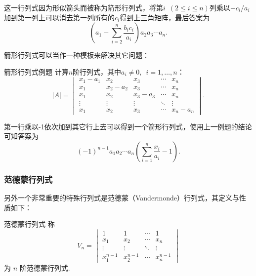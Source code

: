 \begin{solution}
    这一行列式因为形似箭头而被称为箭形行列式，将第$i\enspace(2\leqslant i\leqslant n)$列乘以$-c_i/a_i$加到第一列上可以消去第一列所有的$c_i$得到上三角矩阵，最后答案为
    \[
    (a_1-\sum\limits_{i=2}^n\dfrac{b_ic_i}{a_i})a_2a_3\cdots a_n.
    \]
\end{solution}

箭形行列式可以当作一种模板来解决其它问题：

\begin{example}{}{箭形行列式例题}
    计算$n$阶行列式，其中$a_i\neq 0,\enspace i=1,\ldots,n$：
    \[|A|=\begin{vmatrix}
            x_1-a_1 & x_2     & x_3     & \cdots & x_n     \\
            x_1     & x_2-a_2 & x_3     & \cdots & x_n     \\
            x_1     & x_2     & x_3-a_3 & \cdots & x_n     \\
            \vdots  & \vdots  & \vdots  & \ddots & \vdots  \\
            x_1     & x_2     & x_3     & \cdots & x_n-a_n
        \end{vmatrix}.\]
\end{example}

\begin{solution}
    第一行乘以-1依次加到其它行上去可以得到一个箭形行列式，使用上一例题的结论可知答案为\[(-1)^{n-1}a_1a_2\cdots a_n(\sum\limits_{i=1}^n\dfrac{x_i}{a_i}-1).\]
\end{solution}

\subsubsection{范德蒙行列式}

另外一个非常重要的特殊行列式是范德蒙（Vandermonde）行列式，其定义与性质如下：

\begin{definition}{范德蒙行列式}{}
    称
    \[V_n=\begin{vmatrix}
            1         & 1         & \cdots & 1         \\
            x_1       & x_2       & \cdots & x_n       \\
            \vdots    & \vdots    & \ddots & \vdots    \\
            x_1^{n-1} & x_2^{n-1} & \cdots & x_n^{n-1}
        \end{vmatrix}\]
    为 $n$ 阶范德蒙行列式.
\end{definition}

